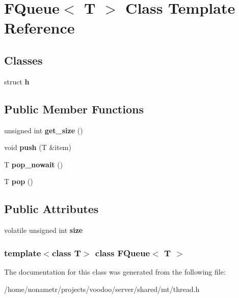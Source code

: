\hypertarget{classFQueue}{\section{\-F\-Queue$<$ \-T $>$ \-Class \-Template \-Reference}
\label{classFQueue}
}
\subsection*{\-Classes}
\begin{DoxyCompactItemize}
\item 
struct {\bfseries h}
\end{DoxyCompactItemize}
\subsection*{\-Public \-Member \-Functions}
\begin{DoxyCompactItemize}
\item 
\hypertarget{classFQueue_a4b35a56d5f8fe8f397e28199a5a8982b}{unsigned int {\bfseries get\-\_\-size} ()}\label{classFQueue_a4b35a56d5f8fe8f397e28199a5a8982b}

\item 
\hypertarget{classFQueue_ade42b2fc46190e8c495146a5ccf8a7db}{void {\bfseries push} (\-T \&item)}\label{classFQueue_ade42b2fc46190e8c495146a5ccf8a7db}

\item 
\hypertarget{classFQueue_afffb1b8c16c376dbd3e07176dcd9db8f}{\-T {\bfseries pop\-\_\-nowait} ()}\label{classFQueue_afffb1b8c16c376dbd3e07176dcd9db8f}

\item 
\hypertarget{classFQueue_af092abd2f72dcd439fae8884c582cd5a}{\-T {\bfseries pop} ()}\label{classFQueue_af092abd2f72dcd439fae8884c582cd5a}

\end{DoxyCompactItemize}
\subsection*{\-Public \-Attributes}
\begin{DoxyCompactItemize}
\item 
\hypertarget{classFQueue_aab9b36ae990932f15d2de208a37c35b6}{volatile unsigned int {\bfseries size}}\label{classFQueue_aab9b36ae990932f15d2de208a37c35b6}

\end{DoxyCompactItemize}
\subsubsection*{template$<$class \-T$>$ class F\-Queue$<$ T $>$}



\-The documentation for this class was generated from the following file\-:\begin{DoxyCompactItemize}
\item 
/home/nonametr/projects/voodoo/server/shared/mt/thread.\-h\end{DoxyCompactItemize}
